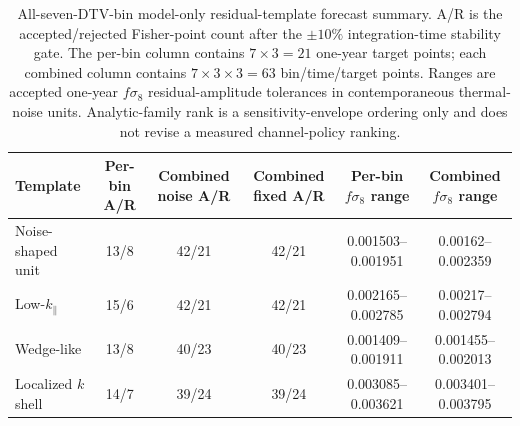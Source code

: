 \begin{table}[tbp]
\centering
\caption{All-seven-DTV-bin model-only residual-template forecast summary. A/R is the accepted/rejected Fisher-point count after the $\pm10\%$ integration-time stability gate. The per-bin column contains $7\times3=21$ one-year target points; each combined column contains $7\times3\times3=63$ bin/time/target points. Ranges are accepted one-year $f\sigma_8$ residual-amplitude tolerances in contemporaneous thermal-noise units. Analytic-family rank is a sensitivity-envelope ordering only and does not revise a measured channel-policy ranking.}
\label{tab:forecast-template-comparison}
\small
\begin{tabular}{lccccc}
\hline
Template & Per-bin A/R & Combined noise A/R & Combined fixed A/R & Per-bin $f\sigma_8$ range & Combined $f\sigma_8$ range \\
\hline
Noise-shaped unit & 13/8 & 42/21 & 42/21 & 0.001503--0.001951 & 0.00162--0.002359 \\
Low-$k_\parallel$ & 15/6 & 42/21 & 42/21 & 0.002165--0.002785 & 0.00217--0.002794 \\
Wedge-like & 13/8 & 40/23 & 40/23 & 0.001409--0.001911 & 0.001455--0.002013 \\
Localized $k$ shell & 14/7 & 39/24 & 39/24 & 0.003085--0.003621 & 0.003401--0.003795 \\
\hline
\end{tabular}
\end{table}
